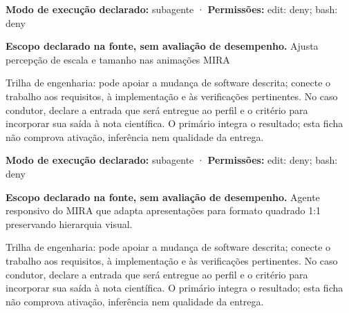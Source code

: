 \begin{arquitetura}
\textbf{Modo de execução declarado:} subagente · \textbf{Permissões:} edit: deny; bash: deny
\end{arquitetura}


\begin{descricao}
\textbf{Escopo declarado na fonte, sem avaliação de desempenho.}
Ajusta percepção de escala e tamanho nas animações MIRA
\end{descricao}

\begin{funcao}
Trilha de engenharia: pode apoiar a mudança de software descrita; conecte o trabalho aos requisitos, à implementação e às verificações pertinentes. No caso condutor, declare a entrada que será entregue ao perfil e o critério para incorporar sua saída à nota científica. O primário integra o resultado; esta ficha não comprova ativação, inferência nem qualidade da entrega.
\end{funcao}

\begin{arquitetura}
\textbf{Modo de execução declarado:} subagente · \textbf{Permissões:} edit: deny; bash: deny
\end{arquitetura}


\begin{descricao}
\textbf{Escopo declarado na fonte, sem avaliação de desempenho.}
Agente responsivo do MIRA que adapta apresentações para formato quadrado 1:1 preservando hierarquia visual.
\end{descricao}

\begin{funcao}
Trilha de engenharia: pode apoiar a mudança de software descrita; conecte o trabalho aos requisitos, à implementação e às verificações pertinentes. No caso condutor, declare a entrada que será entregue ao perfil e o critério para incorporar sua saída à nota científica. O primário integra o resultado; esta ficha não comprova ativação, inferência nem qualidade da entrega.
\end{funcao}

